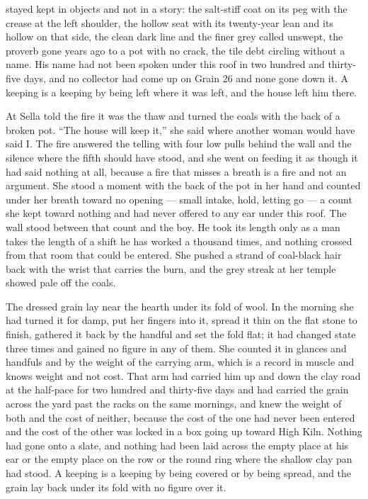  stayed kept in objects and not in a story: the salt-stiff coat on its peg with the crease at the left shoulder, the hollow seat with its twenty-year lean and its hollow on that side, the clean dark line and the finer grey called  unswept, the proverb gone years ago to a pot with no crack, the tile debt circling without a name. His name had not been spoken under this roof in two hundred and thirty-five days, and no collector had come up  on Grain 26 and none gone down it. A keeping is a keeping by being left where it was left, and the house left him there.

At  Sella told the fire it was the thaw and turned the coals with the back of a broken pot. “The house will keep it,” she said where another woman would have said I. The fire answered the telling with four low pulls behind the wall and the silence where the fifth should have stood, and she went on feeding it as though it had said nothing at all, because a fire that misses a breath is a fire and not an argument. She stood a moment with the back of the pot in her hand and counted under her breath toward no opening --- small intake, hold, letting go --- a count she kept toward nothing and had never offered to any ear under this roof. The wall stood between that count and the boy. He took its length only as a man takes the length of a shift he has worked a thousand times, and nothing crossed from that room that could be entered. She pushed a strand of coal-black hair back with the wrist that carries the burn, and the grey streak at her temple showed pale off the coals.

The dressed grain lay near the hearth under its fold of wool. In the morning she had turned it for damp, put her fingers into it, spread it thin on the flat stone to finish, gathered it back by the handful and set the fold flat; it had changed state three times and gained no figure in any of them. She counted it in glances and handfuls and by the weight of the carrying arm, which is a record in muscle and knows weight and not cost. That arm had carried him up and down the clay road at the half-pace for two hundred and thirty-five days and had carried the grain across the yard past the racks on the same mornings, and knew the weight of both and the cost of neither, because the cost of the one had never been entered and the cost of the other was locked in a box going up toward High Kiln. Nothing had gone onto a slate, and nothing had been laid across the empty place at his ear or the empty place on the row or the round ring where the shallow clay pan had stood. A keeping is a keeping by being covered or by being spread, and the grain lay back under its fold with no figure over it.


